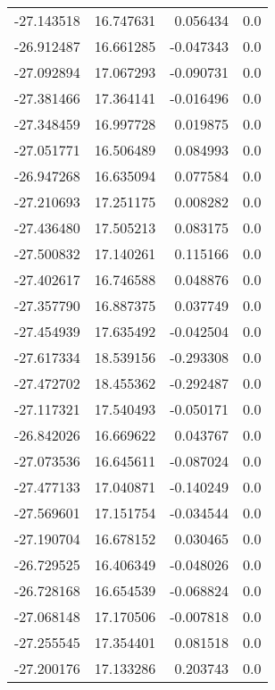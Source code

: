 \begin{tabular}{rrrr}
      -27.143518 &        16.747631 &    0.056434 &   0.0 \\
      -26.912487 &        16.661285 &   -0.047343 &   0.0 \\
      -27.092894 &        17.067293 &   -0.090731 &   0.0 \\
      -27.381466 &        17.364141 &   -0.016496 &   0.0 \\
      -27.348459 &        16.997728 &    0.019875 &   0.0 \\
      -27.051771 &        16.506489 &    0.084993 &   0.0 \\
      -26.947268 &        16.635094 &    0.077584 &   0.0 \\
      -27.210693 &        17.251175 &    0.008282 &   0.0 \\
      -27.436480 &        17.505213 &    0.083175 &   0.0 \\
      -27.500832 &        17.140261 &    0.115166 &   0.0 \\
      -27.402617 &        16.746588 &    0.048876 &   0.0 \\
      -27.357790 &        16.887375 &    0.037749 &   0.0 \\
      -27.454939 &        17.635492 &   -0.042504 &   0.0 \\
      -27.617334 &        18.539156 &   -0.293308 &   0.0 \\
      -27.472702 &        18.455362 &   -0.292487 &   0.0 \\
      -27.117321 &        17.540493 &   -0.050171 &   0.0 \\
      -26.842026 &        16.669622 &    0.043767 &   0.0 \\
      -27.073536 &        16.645611 &   -0.087024 &   0.0 \\
      -27.477133 &        17.040871 &   -0.140249 &   0.0 \\
      -27.569601 &        17.151754 &   -0.034544 &   0.0 \\
      -27.190704 &        16.678152 &    0.030465 &   0.0 \\
      -26.729525 &        16.406349 &   -0.048026 &   0.0 \\
      -26.728168 &        16.654539 &   -0.068824 &   0.0 \\
      -27.068148 &        17.170506 &   -0.007818 &   0.0 \\
      -27.255545 &        17.354401 &    0.081518 &   0.0 \\
      -27.200176 &        17.133286 &    0.203743 &   0.0 \\

\end{tabular}
